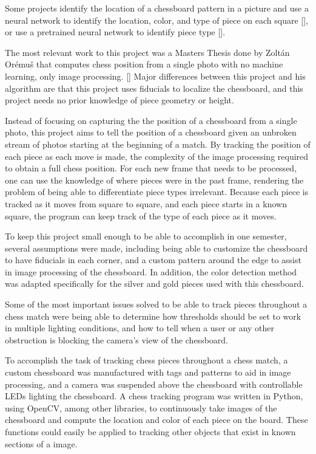 \documentclass[journal]{IEEEtran}
\begin{document}
Some projects identify the location of a chessboard pattern in a picture and use a neural network to identify the location, color, and type of piece on each square [\cite{Czyzewski2018}], or use a pretrained neural network to identify piece type [\cite{Saurabh2019}].

The most relevant work to this project was a Masters Thesis done by Zoltán Orémuš that computes chess position from a single photo with no machine learning, only image processing. [\cite{Orémuš2018}] Major differences between this project and his algorithm are that this project uses fiducials to localize the chessboard, and this project needs no prior knowledge of piece geometry or height.

Instead of focusing on capturing the the position of a chessboard from a single photo, this project aims to tell the position of a chessboard given an unbroken stream of photos starting at the beginning of a match. By tracking the position of each piece as each move is made, the complexity of the image processing required to obtain a full chess position. For each new frame that needs to be processed, one can use the knowledge of where pieces were in the past frame, rendering the problem of being able to differentiate piece types irrelevant. Because each piece is tracked as it moves from square to square, and each piece starts in a known square, the program can keep track of the type of each piece as it moves.

To keep this project small enough to be able to accomplish in one semester, several assumptions were made, including being able to customize the chessboard to have fiducials in each corner, and a custom pattern around the edge to assist in image processing of the chessboard. In addition, the color detection method was adapted specifically for the silver and gold pieces used with this chessboard.

Some of the most important issues solved to be able to track pieces throughout a chess match were being able to determine how thresholds should be set to work in multiple lighting conditions, and how to tell when a user or any other obstruction is blocking the camera's view of the chessboard.

To accomplish the task of tracking chess pieces throughout a chess match, a custom chessboard was manufactured with tags and patterns to aid in image processing, and a camera was suspended above the chessboard with controllable LEDs lighting the chessboard. A chess tracking program was written in Python, using OpenCV, among other libraries, to continuously take images of the chessboard and compute the location and color of each piece on the board. These functions could easily be applied to tracking other objects that exist in known sections of a image.
\end{document}
